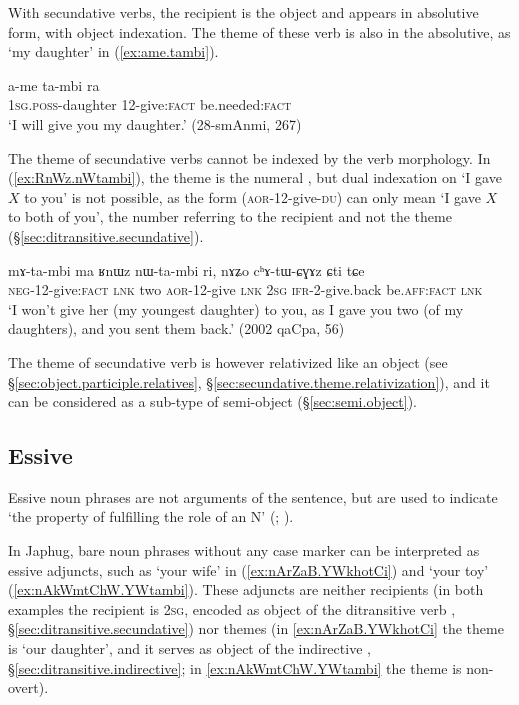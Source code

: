 With secundative verbs, the recipient is the object and appears in absolutive form, with object indexation. The theme of these verb is also in the absolutive, as  `my daughter' in (\ref{ex:ame.tambi}).

\begin{exe}
\ex \label{ex:ame.tambi}
 \gll a-me ta-mbi ra \\
\textsc{1sg}.\textsc{poss}-daughter 1\fl{}2-give:\textsc{fact} be.needed:\textsc{fact} \\
\glt  `I will give you my daughter.'  (28-smAnmi, 267)
\end{exe}

The theme of secundative verbs cannot be indexed by the verb morphology. In (\ref{ex:RnWz.nWtambi}), the theme is the numeral , but dual indexation on  `I gave $X$ to you' is not possible, as the form  (\textsc{aor}-1\fl{}2-give-\textsc{du}) can only mean `I gave $X$ to both of you', the number referring to the recipient and not the theme (§\ref{sec:ditransitive.secundative}). 

\begin{exe}
\ex \label{ex:RnWz.nWtambi}
 \gll mɤ-ta-mbi ma ʁnɯz nɯ-ta-mbi ri, nɤʑo cʰɤ-tɯ-ɕɣɤz ɕti tɕe \\
 \textsc{neg}-1\fl{}2-give:\textsc{fact} \textsc{lnk} two  \textsc{aor}-1\fl{}2-give \textsc{lnk} \textsc{2sg} \textsc{ifr}-2-give.back be.\textsc{aff}:\textsc{fact} \textsc{lnk} \\
 \glt `I won't give her (my youngest daughter) to you, as I gave you two (of my daughters), and you sent them back.' (2002 qaCpa, 56)
\end{exe}

The theme of secundative verb is however relativized like an object (see §\ref{sec:object.participle.relatives}, §\ref{sec:secundative.theme.relativization}), and it can be considered as a sub-type of semi-object (§\ref{sec:semi.object}).

\subsection{Essive} \label{sec:essive.abs} 
Essive noun phrases are not arguments of the sentence, but are used to indicate `the property of fulfilling the role of an N' (\citealt[606]{creissels14functive}; \citealt[225]{jacques16complementation}).

In Japhug, bare noun phrases without any case marker can be interpreted as essive adjuncts, such as  `your wife' in (\ref{ex:nArZaB.YWkhotCi}) and  `your toy' (\ref{ex:nAkWmtChW.YWtambi}). These adjuncts are neither recipients (in both examples the recipient is \textsc{2sg}, encoded as object of the ditransitive verb , §\ref{sec:ditransitive.secundative}) nor themes (in \ref{ex:nArZaB.YWkhotCi} the theme is  `our daughter', and it serves as object of the indirective , §\ref{sec:ditransitive.indirective}; in \ref{ex:nAkWmtChW.YWtambi} the theme is non-overt).

